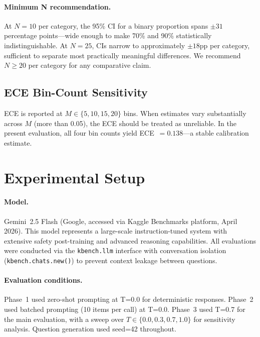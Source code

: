 \documentclass[12pt,a4paper]{article}
\begin{document}
\paragraph{Minimum N recommendation.}
At $N=10$ per category, the 95\% CI for a binary proportion spans $\pm 31$ percentage points---wide enough to make 70\% and 90\% statistically indistinguishable. At $N=25$, CIs narrow to approximately $\pm 18$pp per category, sufficient to separate most practically meaningful differences. We recommend $N \geq 20$ per category for any comparative claim.

\subsection{ECE Bin-Count Sensitivity}

ECE is reported at $M \in \{5, 10, 15, 20\}$ bins. When estimates vary substantially
across $M$ (more than 0.05), the ECE should be treated as unreliable. In the present
evaluation, all four bin counts yield ECE~$= 0.138$---a stable calibration estimate.

\section{Experimental Setup}
\label{sec:setup}

\paragraph{Model.}
Gemini~2.5 Flash (Google, accessed via Kaggle Benchmarks platform, April 2026). This model
represents a large-scale instruction-tuned system with extensive safety post-training and
advanced reasoning capabilities. All evaluations were conducted via the \texttt{kbench.llm}
interface with conversation isolation (\texttt{kbench.chats.new()}) to prevent context leakage
between questions.

\paragraph{Evaluation conditions.}
Phase~1 used zero-shot prompting at T=0.0 for deterministic responses. Phase~2 used
batched prompting (10 items per call) at T=0.0. Phase~3 used T=0.7 for the main
evaluation, with a sweep over $T \in \{0.0, 0.3, 0.7, 1.0\}$ for sensitivity analysis.
Question generation used seed=42 throughout.
\end{document}
